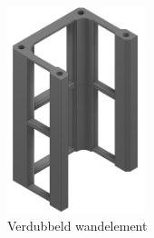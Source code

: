 \begin{minipage}[t]{0.49\textwidth}
    \vspace{0pt}
    \begin{figure}[H]
        \centering
        \captionsetup{width=1\textwidth} %
        \includegraphics[height=6cm]{figures/Wall_2_w.png}
        \caption{Verdubbeld wandelement}\label{fig:dubbelemuur}
    \end{figure}
\end{minipage}\\

